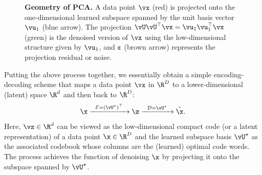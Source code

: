 \documentclass[../../book-main.tex]{subfiles}
\begin{document}
\begin{figure}
    \centering
    \caption{\small \textbf{Geometry of PCA.} A data point $\vx$ (red) is projected onto the one-dimensional learned subspace spanned by the unit basis vector $\vu_1$ (blue arrow). The projection $\vU\vU^\top\vx = \vu_{1}\vu_{1}^{\top}\vx$ (green) is the denoised version of $\vx$ using the low-dimensional structure given by $\vu_{1}$, and $\boldsymbol{\varepsilon}$ (brown arrow) represents the projection residual or noise.}
    \label{fig:pca-geometry}
\end{figure}

Putting the above process together, we essentially obtain a simple encoding-decoding scheme that maps a data point $\vx$ in $\R^D$ to a lower-dimensional (latent) space $\R^d$ and then back to $\R^D$:
\begin{equation}
\x \xrightarrow{\hspace{2mm} \mathcal{E} = (\vU^\star)^\top \hspace{2mm}}  \z
    \xrightarrow{\hspace{2mm} \mathcal{D} = \vU^\star \hspace{2mm}}   \hat{\x}.  
\label{eqn:autoencoding-PCA}
\end{equation}
Here, $\vz \in \R^d$ can be viewed as the low-dimensional compact code (or
a latent representation) of a data point  $\x \in \R^D$ and the learned subspace
basis $\vU^\star$ as the associated codebook whose columns are the (learned)
optimal code words. The process achieves the function of denoising $\x$ by
projecting it onto the subspace spanned by $\vU^\star$.
\end{document}
